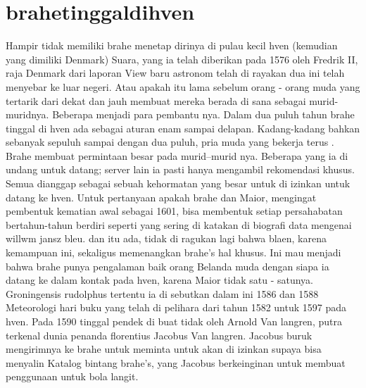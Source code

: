\section{brahetinggaldihven}
Hampir tidak memiliki brahe menetap dirinya di pulau kecil hven (kemudian yang dimiliki Denmark) Suara, 
yang ia telah diberikan pada 1576 oleh Fredrik II, raja Denmark dari laporan View baru astronom telah di rayakan dua ini telah menyebar ke luar negeri. 
Atau apakah itu lama sebelum orang - orang muda yang tertarik dari dekat dan jauh membuat mereka berada di sana sebagai murid-muridnya. 
Beberapa menjadi para pembantu nya. Dalam dua puluh tahun brahe tinggal di hven ada sebagai aturan enam sampai delapan. 
Kadang-kadang bahkan sebanyak sepuluh sampai dengan dua puluh, pria muda yang bekerja terus . 
Brahe membuat permintaan besar pada murid–murid nya. Beberapa yang ia di undang untuk datang; server lain ia pasti hanya mengambil rekomendasi khusus. 
Semua dianggap sebagai sebuah kehormatan yang besar untuk di izinkan untuk datang ke hven. 
Untuk pertanyaan apakah brahe dan Maior, mengingat pembentuk kematian awal sebagai 1601, 
bisa membentuk setiap persahabatan bertahun-tahun berdiri seperti yang sering di katakan di biografi data mengenai willwm jansz bleu. 
dan itu ada, tidak di ragukan lagi bahwa blaen, karena kemampuan ini, sekaligus memenangkan brahe's hal khusus. 
Ini mau menjadi bahwa brahe punya pengalaman baik orang Belanda muda dengan siapa ia datang ke dalam kontak pada hven, 
karena Maior tidak satu - satunya. Groningensis rudolphus tertentu ia di sebutkan dalam ini 1586 dan 1588 Meteorologi 
hari buku yang telah di pelihara dari tahun 1582 untuk 1597 pada hven. 
Pada 1590 tinggal pendek di buat tidak oleh Arnold Van langren, 
putra terkenal dunia penanda florentius Jacobus Van langren. 
Jacobus buruk mengirimnya ke brahe untuk meminta untuk akan di izinkan supaya bisa menyalin Katalog bintang brahe's, 
yang Jacobus berkeinginan untuk membuat penggunaan untuk bola langit. 

\cite{Richter1939Willem}


